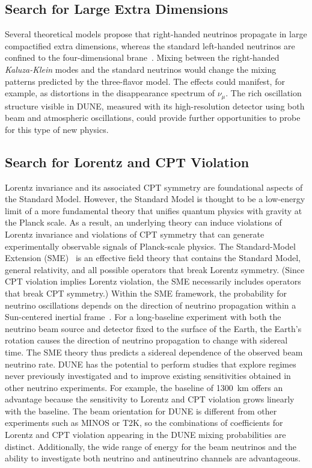 \subsection{Search for Large Extra Dimensions}

Several theoretical models propose that right-handed neutrinos
propagate in large compactified extra dimensions, whereas the standard
left-handed neutrinos are confined to the four-dimensional
brane~\cite{Machado:2011wx}. Mixing between the right-handed
\emph{Kaluza-Klein} modes and the standard neutrinos would change the
mixing patterns predicted by the three-flavor model. The effects could
manifest, for example, as distortions in the disappearance spectrum of
$\nu_\mu$.  The rich oscillation structure visible in DUNE, measured
with its high-resolution detector using both beam and atmospheric
oscillations, could provide further opportunities to probe for this
type of new physics.

\subsection{Search for Lorentz and CPT Violation}

Lorentz invariance and its associated CPT symmetry are foundational
aspects of the Standard Model. However, the Standard Model is thought
to be a low-energy limit of a more fundamental theory that unifies
quantum physics with gravity at the Planck scale. As a result, an
underlying theory can induce violations of Lorentz invariance and
violations of CPT symmetry that can generate experimentally observable
signals of Planck-scale physics.  The Standard-Model Extension
(SME)~\cite{Colladay:1996iz,Colladay:1998fq,Kostelecky:2003fs} is an
effective field theory that contains the Standard Model, general
relativity, and all possible operators that break Lorentz
symmetry. (Since CPT violation implies Lorentz violation, the SME
necessarily includes operators that break CPT symmetry.)  Within the
SME framework, the probability for neutrino oscillations depends on
the direction of neutrino propagation within a Sun-centered inertial
frame~\cite{Kostelecky:2003cr,Kostelecky:2011gq}.  For a long-baseline
experiment with both the neutrino beam source and detector fixed to
the surface of the Earth, the Earth's rotation causes the direction of
neutrino propagation to change with sidereal time.  The SME theory
thus predicts a sidereal dependence of the observed beam neutrino
rate.  DUNE has the potential to perform studies that explore regimes
never previously investigated and to improve existing sensitivities
obtained in other neutrino experiments.  For example, the baseline of
1300~km offers an advantage because the sensitivity to
Lorentz and CPT violation grows linearly with the baseline.  The beam
orientation for DUNE is different from other experiments such as MINOS
or T2K, so the combinations of coefficients for Lorentz and CPT
violation appearing in the DUNE mixing probabilities are
distinct. Additionally, the wide range of energy for the beam
neutrinos and the ability to investigate both neutrino and
antineutrino channels are advantageous.



